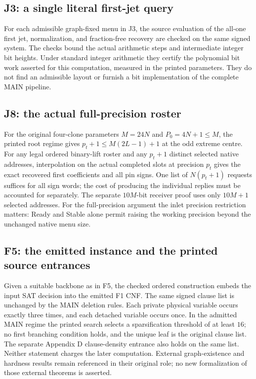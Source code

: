\documentclass[
  11pt,
]{article}
\begin{document}
\subsection{J3: a single literal first-jet query}
For each admissible graph-fixed menu in J3, the source evaluation of the
all-one first jet, normalization, and fraction-free recovery are checked
on the same signed system. The checks bound the actual arithmetic steps
and intermediate integer bit heights. Under standard integer arithmetic
they certify the polynomial bit work asserted for this computation,
measured in the printed parameters. They do not find an admissible
layout or furnish a bit implementation of the complete MAIN pipeline.

\subsection{J8: the actual full-precision roster}
For the original four-clone parameters $M=24N$ and $P_0=4N+1\le M$,
the printed root regime gives $p_t+1\le M(2L-1)+1$ at the odd extreme centre.
For any legal ordered binary-lift roster and any $p_t+1$ distinct
selected native addresses, interpolation on the actual completed slots
at precision $p_t$ gives the exact recovered first coefficients and all
pin signs. One list of $N(p_t+1)$ requests suffices for all sign words;
the cost of producing the individual replies must be accounted for separately. The separate
$10M$-bit receiver proof uses only $10M+1$ selected addresses. For the
full-precision argument the inlet precision restriction matters: Ready
and Stable alone permit raising the working precision beyond the
unchanged native menu size.

\subsection{F5: the emitted instance and the printed source entrances}
Given a suitable backbone as in F5, the checked ordered construction
embeds the input SAT decision into the emitted F1 CNF. The same signed
clause list is unchanged by the MAIN deletion rules. Each private
physical variable occurs exactly three times, and each detached variable
occurs once. In the admitted MAIN regime the printed search selects
a sparsification threshold of at least $16$; no first branching
condition holds, and the unique leaf is the original clause list.
The separate Appendix D clause-density entrance also holds on the
same list. Neither statement charges the later computation.
External graph-existence and hardness results remain referenced in
their original role; no new formalization of those external theorems is
asserted.
\end{document}
